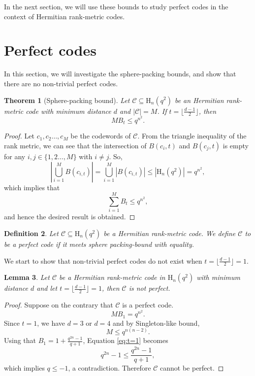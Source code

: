 \documentclass[12pt,a4paper]{article}
\newtheorem{theorem}{Theorem}[section]
\newtheorem{lemma}[theorem]{Lemma}
\newtheorem{definition}[theorem]{Definition}
\begin{document}
In the next section, we will use these bounds to study perfect codes in the context of Hermitian rank-metric codes.
\section{Perfect codes }\label{sec; 3}
In this section, we will investigate the sphere-packing bounds, and show that there are no non-trivial perfect codes.
\begin{theorem}[Sphere-packing bound]
Let $\mathscr{C}\subseteq \mathrm{H}_n(q^2)$ be an Hermitian rank-metric code with minimum distance $d$ and $|\mathscr{C}|=M$. If $t=\lfloor\frac{d-1}{2}\rfloor$, then 
\[MB_{t}\leq q^{n^2}.\]
\end{theorem}
\begin{proof}
Let $c_1,c_2\ldots,c_M $ be the codewords of $\mathscr{C}$. From the triangle inequality of the rank metric, we can see that the intersection of $B(c_i,t)$ and $B(c_j,t)$ is empty for any $i,j\in\{1,2\ldots,M\}$ with $i\neq j$.
So,
    \[\left|\bigcup^{M}_{i=1}B(c_{i,t})\right|=\bigcup^{M}_{i=1}\left| B(c_{i,t})\right|\leq |\mathrm{H}_n(q^2)|=q^{n^2},\]
    which implies that 
    \[\sum^{M}_{i=1}B_{t}\leq q^{n^2},\]
    and hence the desired result is obtained.     
\end{proof}
\begin{definition}
    Let $\mathscr{C}\subseteq \mathrm{H}_n(q^2)$  be a Hermitian rank-metric code. We define $\mathscr{C}$ to be a perfect code if it meets sphere packing-bound with equality.
    \end{definition}
    We start to show that non-trivial perfect codes do not exist when $t=\lfloor\frac{d-1}{2}\rfloor=1$. 
  \begin{lemma}\label{lem:t=1}
      Let $\mathscr{C}$ be a Hermitian rank-metric code in $\mathrm{H}_{n}(q^2)$ with minimum distance $d$ and let $t=\lfloor\frac{d-1}{2}\rfloor=1$, then $\mathscr{C}$ is not perfect.
  \end{lemma}
\begin{proof}
Suppose on the contrary that $\mathscr{C}$ is a perfect code.
\begin{equation}\label{eq:t=1}
  MB_{1}=q^{n^2}. 
\end{equation}
Since $t=1$, we have $d=3$ or $d=4$ and by {Singleton-like bound}, 
\[M\leq q^{n(n-2)}.\]
Using that $B_1=1+\frac{q^{2n}-1}{q+1}$, Equation \eqref{eq:t=1} becomes 
\[q^{2n}-1\leq \frac{q^{2n}-1}{q+1},\]
which implies $q\leq-1$, a contradiction. Therefore $\mathscr{C}$ cannot be perfect.  
  
\end{proof}
 
\end{document}
